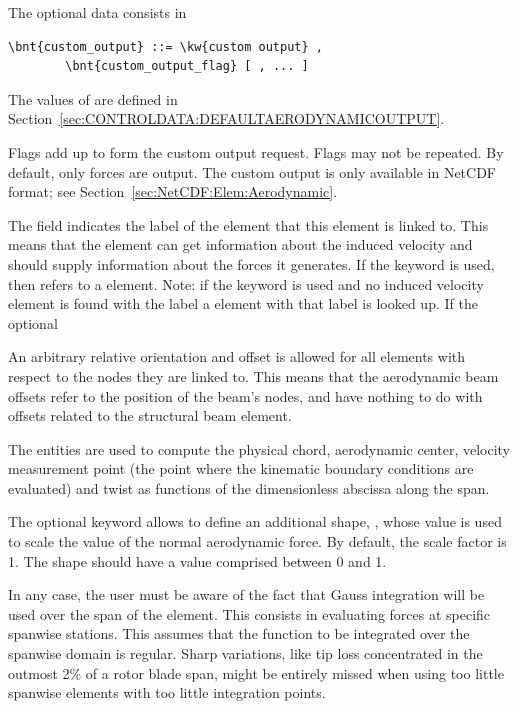 The  optional data consists in
\begin{Verbatim}[commandchars=\\\{\}]
    \bnt{custom_output} ::= \kw{custom output} , 
        \bnt{custom_output_flag} [ , ... ]
\end{Verbatim}
The values of 
are defined in Section~\ref{sec:CONTROLDATA:DEFAULTAERODYNAMICOUTPUT}.

Flags add up to form the custom output request.
Flags may not be repeated.
By default, only forces are output.
The custom output is only available in NetCDF format;
see Section~\ref{sec:NetCDF:Elem:Aerodynamic}.

The field  indicates the label
of the  element that this element is linked to.
This means that the element can get information about the
induced velocity and should supply information about the forces it generates.
If the keyword  is used,
then  refers to a  element.
Note: if the keyword  is used
and no induced velocity element is found with the label 
a  element with that label is looked up.
If the optional 

An arbitrary relative orientation and offset is allowed for all elements with
respect to the nodes they are linked to. 
This means that the aerodynamic beam offsets refer to the position
of the beam's nodes, and have nothing to do with offsets related
to the structural beam element.

The  entities are used to compute the physical chord,
aerodynamic center, velocity measurement point (the point where the
kinematic boundary conditions are evaluated) and twist as functions 
of the dimensionless abscissa along the span.

The optional  keyword allows to define an additional shape,
,
whose value is used to scale the value of the normal aerodynamic force.
By default, the scale factor is 1.
The  shape should have a value comprised between 0 and 1.

In any case, the user must be aware of the fact that Gauss integration
will be used over the span of the element.
This consists in evaluating forces at specific spanwise stations.
This assumes that the function to be integrated over the spanwise domain
is regular.
Sharp variations, like tip loss concentrated in the outmost 2\%
of a rotor blade span, might be entirely missed when using too little
spanwise elements with too little integration points.

